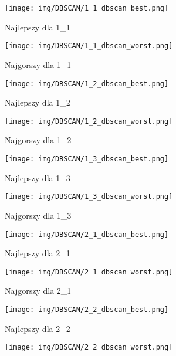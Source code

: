 \documentclass[12pt]{article}
\begin{document}
\begin{figure}[H]
    \centering
    \begin{subfigure}[b]{0.24\textwidth}
        \texttt{[image: img/DBSCAN/1\_1\_dbscan\_best.png]}
        \caption{Najlepszy dla 1\_1}
    \end{subfigure}
    \hfill
    \begin{subfigure}[b]{0.24\textwidth}
        \texttt{[image: img/DBSCAN/1\_1\_dbscan\_worst.png]}
        \caption{Najgorszy dla 1\_1}
    \end{subfigure}
    \hfill
    \begin{subfigure}[b]{0.24\textwidth}
        \texttt{[image: img/DBSCAN/1\_2\_dbscan\_best.png]}
        \caption{Najlepszy dla 1\_2}
    \end{subfigure}
    \hfill
    \begin{subfigure}[b]{0.24\textwidth}
        \texttt{[image: img/DBSCAN/1\_2\_dbscan\_worst.png]}
        \caption{Najgorszy dla 1\_2}
    \end{subfigure}
    \begin{subfigure}[b]{0.24\textwidth}
        \texttt{[image: img/DBSCAN/1\_3\_dbscan\_best.png]}
        \caption{Najlepszy dla 1\_3}
    \end{subfigure}
    \hfill
    \begin{subfigure}[b]{0.24\textwidth}
        \texttt{[image: img/DBSCAN/1\_3\_dbscan\_worst.png]}
        \caption{Najgorszy dla 1\_3}
    \end{subfigure}
    \hfill
    \begin{subfigure}[b]{0.24\textwidth}
        \texttt{[image: img/DBSCAN/2\_1\_dbscan\_best.png]}
        \caption{Najlepszy dla 2\_1}
    \end{subfigure}
    \hfill
    \begin{subfigure}[b]{0.24\textwidth}
        \texttt{[image: img/DBSCAN/2\_1\_dbscan\_worst.png]}
        \caption{Najgorszy dla 2\_1}
    \end{subfigure}
    \begin{subfigure}[b]{0.24\textwidth}
        \texttt{[image: img/DBSCAN/2\_2\_dbscan\_best.png]}
        \caption{Najlepszy dla 2\_2}
    \end{subfigure}
    \hfill
    \begin{subfigure}[b]{0.24\textwidth}
        \texttt{[image: img/DBSCAN/2\_2\_dbscan\_worst.png]}

\end{subfigure}
\end{figure}
\end{document}
